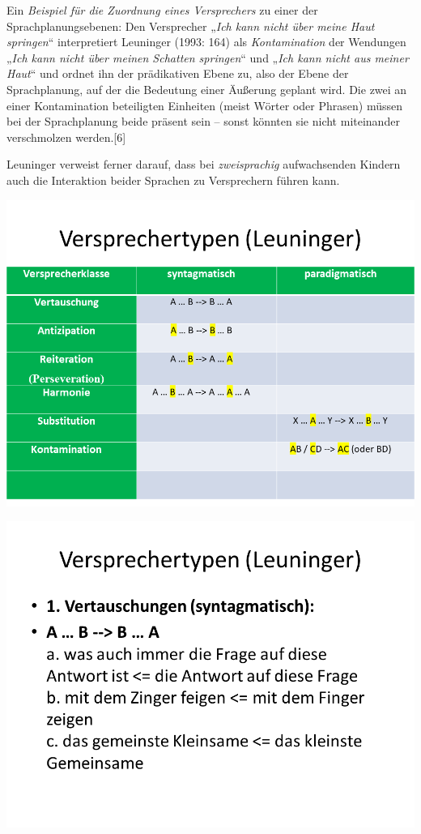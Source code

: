 \documentclass[
  letterpaper,
]{scrbook}
\begin{document}
Ein \emph{Beispiel für die Zuordnung eines Versprechers} zu einer der
Sprachplanungsebenen: Den Versprecher „\emph{Ich kann nicht über meine
Haut springen}`` interpretiert Leuninger (1993: 164) als
\emph{Kontamination} der Wendungen „\emph{Ich kann nicht über meinen
Schatten springen}`` und „\emph{Ich kann nicht aus meiner Haut}`` und
ordnet ihn der prädikativen Ebene zu, also der Ebene der Sprachplanung,
auf der die Bedeutung einer Äußerung geplant wird. Die zwei an einer
Kontamination beteiligten Einheiten (meist Wörter oder Phrasen) müssen
bei der Sprachplanung beide präsent sein -- sonst könnten sie nicht
miteinander verschmolzen werden.{[}6{]}

Leuninger verweist ferner darauf, dass bei \emph{zweisprachig}
aufwachsenden Kindern auch die Interaktion beider Sprachen zu
Versprechern führen kann.

\includegraphics[width=1\textwidth,height=\textheight]{./pictures/Versprechertypen_2.PNG}

\includegraphics[width=1\textwidth,height=\textheight]{./pictures/Versprechertypen_3.PNG}
\end{document}
